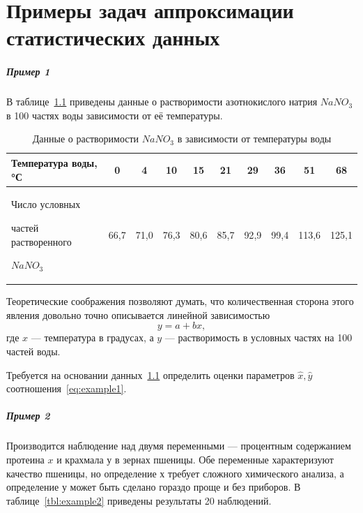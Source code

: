 \chapter{Примеры задач аппроксимации статистических данных}

\paragraph*{Пример 1~\cite{markov24}}
В таблице~\ref{tbl:example1} приведены данные о растворимости
азотнокислого натрия \( NaNO_3 \) в 100 частях воды зависимости от её температуры.

\begin{table}[h!]
  \caption{Данные о растворимости \( NaNO_3 \) в зависимости от температуры воды\label{tbl:example1}}
  \small
  \begin{tabular}{| m{5.5cm} | c | c | c | c | c | c | c | c | c |}
    \hline
    Температура воды, °С
    & 0
    & 4
    & 10
    & 15
    & 21
    & 29
    & 36
    & 51
    & 68 \\
    \hline
    Число условных \par
    частей растворенного \par
    \( NaNO_3 \)
    & 66{,}7
    & 71{,}0
    & 76{,}3
    & 80{,}6
    & 85{,}7
    & 92{,}9
    & 99{,}4
    & 113{,}6
    & 125{,}1 \\
    \hline
    \end{tabular}
\end{table}

Теоретические соображения позволяют думать,
что количественная сторона этого явления довольно точно описывается линейной зависимостью
\begin{equation}
  \label{eq:example1}
  y = a + bx,
\end{equation}
где
\( x \) --- температура в градусах, а
\( y \) --- растворимость в условных частях на 100 частей воды.

Требуется на основании данных~\ref{tbl:example1} определить оценки параметров
\( \hat{x}, \hat{y} \) соотношения~\eqref{eq:example1}.

\paragraph*{Пример 2~\cite{ezekiel41}}

Производится наблюдение над двумя переменными ---
процентным содержанием протеина \( x \) и крахмала \( у \) в зернах пшеницы.
Обе переменные характеризуют качество пшеницы, но определение \( х \) требует
сложного химического анализа, а определение \( у \) может быть сделано
гораздо проще и без приборов.
В таблице~\ref{tbl:example2} приведены результаты 20 наблюдений.

